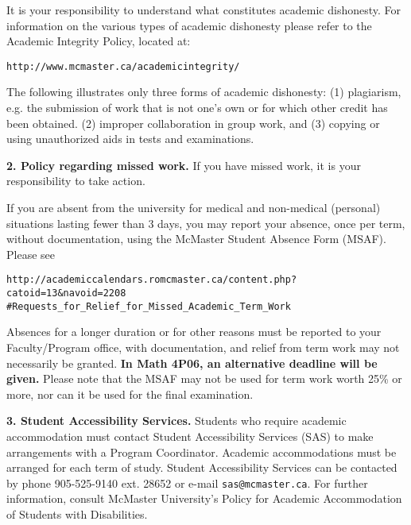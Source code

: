 \documentclass[10pt,oneside]{amsart}
\begin{document}
\noindent
It is your responsibility to understand what constitutes academic 
dishonesty. For information on the various types of academic dishonesty 
please refer to the Academic Integrity Policy, located at:
\vspace{.25cm}
 
{\tt http://www.mcmaster.ca/academicintegrity/}
\vspace{.25cm}

\noindent
The following illustrates only three forms of academic dishonesty:
(1) plagiarism, e.g. the submission of work that is not one's own 
or for which other credit has been obtained.
(2) improper collaboration in group work,
and (3) copying or using unauthorized aids in tests and examinations.
\vspace{.25cm}

\noindent
{\bf 2. Policy regarding missed work.}
If you have missed work, it is your responsibility to take action.
\vspace{.25cm}

\noindent
If you are absent from the university for 
medical and non-medical (personal) situations
lasting fewer than 3 days, you may report your absence, once per term, 
without documentation, using the McMaster Student Absence Form (MSAF). 
Please see
\vspace{.25cm}


\noindent
{\tt http://academiccalendars.romcmaster.ca/content.php?catoid=13\&navoid=2208\newline
\#Requests\_for\_Relief\_for\_Missed\_Academic\_Term\_Work}
\vspace{.25cm}

\noindent
Absences for a longer duration or for other reasons must be reported to 
your Faculty/Program office, with documentation, and relief from term work 
may not necessarily be granted. 
{\bf In Math 4P06, an alternative deadline will be given.}
Please note that the MSAF may not be used for term work worth 25\% or more, 
nor can it be used for the final examination.
\vspace{.25cm}

\noindent
{\bf 3. Student Accessibility Services.}
Students who require academic accommodation must contact Student Accessibility
Services (SAS) to make arrangements with a Program Coordinator. 
Academic accommodations must be arranged for each term of study. 
Student Accessibility Services can be contacted by phone 
905-525-9140 ext. 28652 or e-mail {\tt sas@mcmaster.ca}. 
For further information, consult McMaster University’s Policy for 
Academic Accommodation of Students with Disabilities.
\vspace{.25cm}
\end{document}

